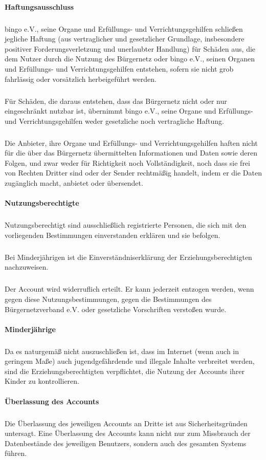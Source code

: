 \begin{multicols}{2}
\paragraph{Haftungsausschluss}
\subparagraph{} bingo e.V., seine Organe und Erfüllungs- und Verrichtungsgehilfen schließen
jegliche Haftung (aus vertraglicher und gesetzlicher Grundlage, insbesondere
positiver Forderungsverletzung und unerlaubter Handlung) für Schäden aus,
die dem Nutzer durch die Nutzung des Bürgernetz oder bingo e.V., seinen
Organen und Erfüllungs- und Verrichtungsgehilfen entstehen, sofern sie nicht
grob fahrlässig oder vorsätzlich herbeigeführt werden.
\subparagraph{} Für Schäden, die daraus entstehen, dass das Bürgernetz nicht oder nur
eingeschränkt nutzbar ist, übernimmt bingo e.V., seine Organe und
Erfüllungs- und Verrichtungsgehilfen weder gesetzliche noch vertragliche
Haftung.
\subparagraph{} Die Anbieter, ihre Organe und Erfüllungs- und Verrichtungsgehilfen haften
nicht für die über das Bürgernetz übermittelten Informationen und Daten
sowie deren Folgen, und zwar weder für Richtigkeit noch Vollständigkeit,
noch dass sie frei von Rechten Dritter sind oder der Sender rechtmäßig
handelt, indem er die Daten zugänglich macht, anbietet oder übersendet.

\paragraph{Nutzungsberechtigte}
\subparagraph{} Nutzungsberechtigt sind ausschließlich registrierte Personen, die sich mit den
vorliegenden Bestimmungen einverstanden erklären und sie befolgen.
\subparagraph{} Bei Minderjährigen ist die Einverständniserklärung der
Erziehungsberechtigten nachzuweisen.
\subparagraph{} Der Account wird widerruflich erteilt. Er kann jederzeit entzogen werden,
wenn gegen diese Nutzungsbestimmungen, gegen die Bestimmungen des
Bürgernetzverband e.V. oder gesetzliche Vorschriften verstoßen wurde.

\paragraph{Minderjährige}
\subparagraph{} Da es naturgemäß nicht auszuschließen ist, dass im Internet (wenn auch in
geringem Maße) auch jugendgefährdende und illegale Inhalte verbreitet
werden, sind die Erziehungsberechtigten verpflichtet, die Nutzung der
Accounts ihrer Kinder zu kontrollieren.

\paragraph{Überlassung des Accounts}
\subparagraph{} Die Überlassung des jeweiligen Accounts an Dritte ist aus Sicherheitsgründen
untersagt. Eine Überlassung des Accounts kann nicht nur zum Missbrauch
der Datenbestände des jeweiligen Benutzers, sondern auch des gesamten
Systems führen.


\end{multicols}

